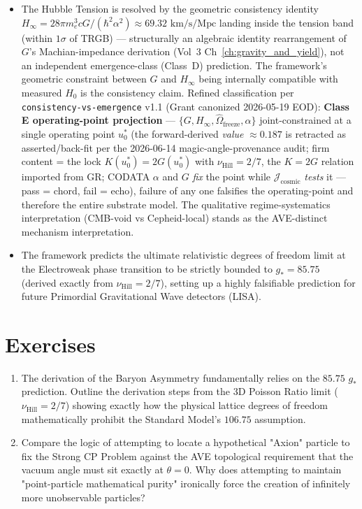 \begin{itemize}
    \item The Hubble Tension is resolved by the geometric consistency identity $H_\infty = 28\pi m_e^3 cG/(\hbar^2\alpha^2) \approx 69.32\text{ km/s/Mpc}$ landing inside the tension band (within $1\sigma$ of TRGB) --- structurally an algebraic identity rearrangement of $G$'s Machian-impedance derivation (Vol~3 Ch~\ref{ch:gravity_and_yield}), not an independent emergence-class (Class~D) prediction. The framework's geometric constraint between $G$ and $H_\infty$ being internally compatible with measured $H_0$ is the consistency claim. Refined classification per \texttt{consistency-vs-emergence} v1.1 (Grant canonized 2026-05-19 EOD): \textbf{Class E operating-point projection} --- $\{G, H_\infty, \hat{\Omega}_{\text{freeze}}, \alpha\}$ joint-constrained at a single operating point $u_0^*$ (the forward-derived \emph{value} $\approx 0.187$ is retracted as asserted/back-fit per the 2026-06-14 magic-angle-provenance audit; firm content = the lock $K(u_0^*) = 2G(u_0^*)$ with $\nu_{\text{Hill}} = 2/7$, the $K=2G$ relation imported from GR; CODATA $\alpha$ and $G$ \emph{fix} the point while $\mathcal{J}_{\text{cosmic}}$ \emph{tests} it --- pass = chord, fail = echo), failure of any one falsifies the operating-point and therefore the entire substrate model. The qualitative regime-systematics interpretation (CMB-void vs Cepheid-local) stands as the AVE-distinct mechanism interpretation.
    \item The framework predicts the ultimate relativistic degrees of freedom limit at the Electroweak phase transition to be strictly bounded to $g_* = 85.75$ (derived exactly from $\nu_{\text{Hill}} = 2/7$), setting up a highly falsifiable prediction for future Primordial Gravitational Wave detectors (LISA).
\end{itemize}

\section*{Exercises}
\begin{enumerate}
    \item The derivation of the Baryon Asymmetry fundamentally relies on the $85.75$ $g_*$ prediction. Outline the derivation steps from the 3D Poisson Ratio limit ($\nu_{\text{Hill}} = 2/7$) showing exactly how the physical lattice degrees of freedom mathematically prohibit the Standard Model's $106.75$ assumption.
    \item Compare the logic of attempting to locate a hypothetical "Axion" particle to fix the Strong CP Problem against the AVE topological requirement that the vacuum angle must sit exactly at $\theta = 0$. Why does attempting to maintain "point-particle mathematical purity" ironically force the creation of infinitely more unobservable particles?
\end{enumerate}

